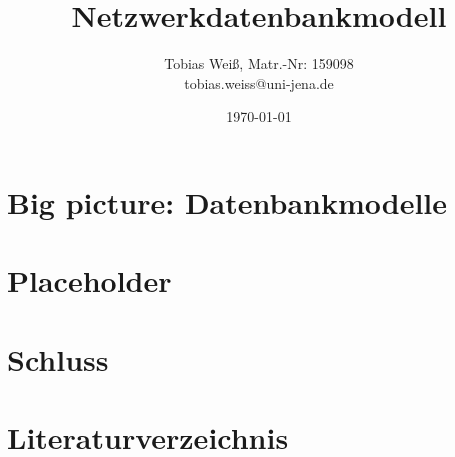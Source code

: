 \documentclass[11pt,a4paper,paper=a4,oneside,parskip=half+,pdftex]{scrarticle}
\begin{document}
\titlehead{MW31.6 - Data and Knowledge Management}
\subject{Handout}
\title{Netzwerkdatenbankmodell}
\author{Tobias Weiß, Matr.-Nr: 159098\\tobias.weiss@uni-jena.de}
\date{\today}
\maketitle
\tableofcontents

\section{Big picture: Datenbankmodelle}
\lipsum

\section{Placeholder}
\lipsum

\section{Schluss}
\lipsum

\section{Literaturverzeichnis}


\end{document}
